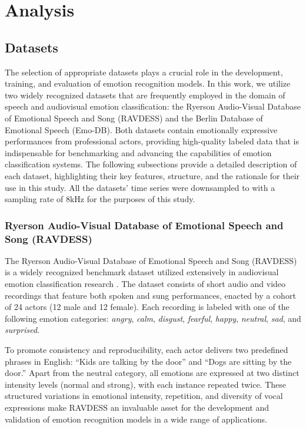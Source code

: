 \chapter{Analysis} \label{chap:analysis}

\section{Datasets}

The selection of appropriate datasets plays a crucial role in the development, training, and evaluation of emotion recognition models. In this work, we utilize two widely recognized datasets that are frequently employed in the domain of speech and audiovisual emotion classification: the Ryerson Audio-Visual Database of Emotional Speech and Song (RAVDESS) and the Berlin Database of Emotional Speech (Emo-DB). Both datasets contain emotionally expressive performances from professional actors, providing high-quality labeled data that is indispensable for benchmarking and advancing the capabilities of emotion classification systems. The following subsections provide a detailed description of each dataset, highlighting their key features, structure, and the rationale for their use in this study. All the datasets' time series were downsampled to with a sampling rate of $8\text{kHz}$ for the purposes of this study.

\subsection{Ryerson Audio-Visual Database of Emotional Speech and Song (RAVDESS)} %

The Ryerson Audio-Visual Database of Emotional Speech and Song (RAVDESS) \cite{ravdess} is a widely recognized benchmark dataset utilized extensively in audiovisual emotion classification research \cite{anusha2021, vimal2021, abdullah2020}. The dataset consists of short audio and video recordings that feature both spoken and sung performances, enacted by a cohort of 24 actors (12 male and 12 female). Each recording is labeled with one of the following emotion categories: \textit{angry}, \textit{calm}, \textit{disgust}, \textit{fearful}, \textit{happy}, \textit{neutral}, \textit{sad}, and \textit{surprised}.

To promote consistency and reproducibility, each actor delivers two predefined phrases in English: ``Kids are talking by the door'' and ``Dogs are sitting by the door.'' Apart from the neutral category, all emotions are expressed at two distinct intensity levels (normal and strong), with each instance repeated twice. These structured variations in emotional intensity, repetition, and diversity of vocal expressions make RAVDESS an invaluable asset for the development and validation of emotion recognition models in a wide range of applications.

